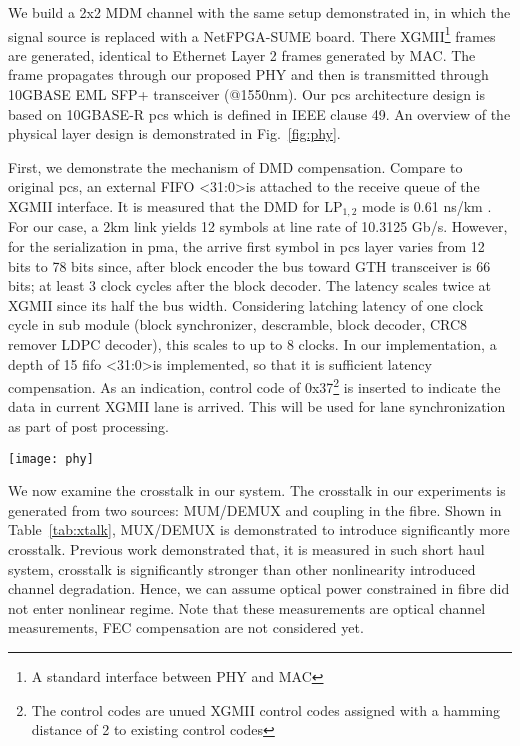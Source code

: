 We build a 2x2 MDM channel with the same setup demonstrated in\cite{6706113}, in which the signal source is replaced with a NetFPGA-SUME board. There XGMII\footnote{A standard interface between PHY and MAC} frames are generated, identical to Ethernet Layer 2 frames generated by MAC. The frame propagates through our proposed PHY and then is transmitted through 10GBASE EML SFP+ transceiver (@1550nm). Our \ac{pcs} architecture design is based on 10GBASE-R \ac{pcs} which is defined in IEEE clause 49. An overview of the physical layer design is demonstrated in Fig.~\ref{fig:phy}.

First, we demonstrate the mechanism of DMD compensation. Compare to original \ac{pcs}, an external FIFO \textless31:0\textgreater is attached to the receive queue of the XGMII interface. It is measured that the DMD for LP$_{1,2}$ mode is 0.61 ns/km \cite{shi2015slm}. For our case, a 2km link yields 12 symbols at line rate of 10.3125 Gb/s. However, for the serialization in \ac{pma}, the arrive first symbol in \ac{pcs} layer varies from 12 bits to 78 bits since, after block encoder the bus toward GTH transceiver is 66 bits; at least 3 clock cycles after the block decoder. The latency scales twice at XGMII since its half the bus width. Considering latching latency of one clock cycle in sub module (block synchronizer, descramble, block decoder, CRC8 remover LDPC decoder), this scales to up to 8 clocks. In our implementation, a depth of 15 fifo \textless31:0\textgreater is implemented, so that it is sufficient latency compensation. As an indication, control code of 0x37\footnote{The control codes are unued XGMII control codes assigned with a hamming distance of 2 to existing control codes} is inserted to indicate the data in current XGMII lane is arrived. This will be used for lane synchronization as part of post processing. 

\begin{figure*}[h]%
   \centering
   \texttt{[image: phy]}
  \caption{Physical layer architecture (yellow blocks are implemented logics, blue blocks are ASICs implemented inside FPGA): a) standard Ethernet physical layer architecture for 10GBASE-KR, an optional FEC is offered. b) Proposed physical layer for a single lane. c) multi-lane physical layer post process}
    \label{fig:phy}
\end{figure*}

We now examine the crosstalk in our system. The crosstalk in our experiments is generated from two sources: MUM/DEMUX and coupling in the fibre. Shown in Table~\ref{tab:xtalk}, MUX/DEMUX is demonstrated to introduce significantly more crosstalk. Previous work demonstrated that, it is measured in such short haul system, crosstalk is significantly stronger than other nonlinearity introduced channel degradation\cite{shi2015slm}. Hence, we can assume optical power constrained in fibre did not enter nonlinear regime. Note that these measurements are optical channel measurements, FEC compensation are not considered yet.

